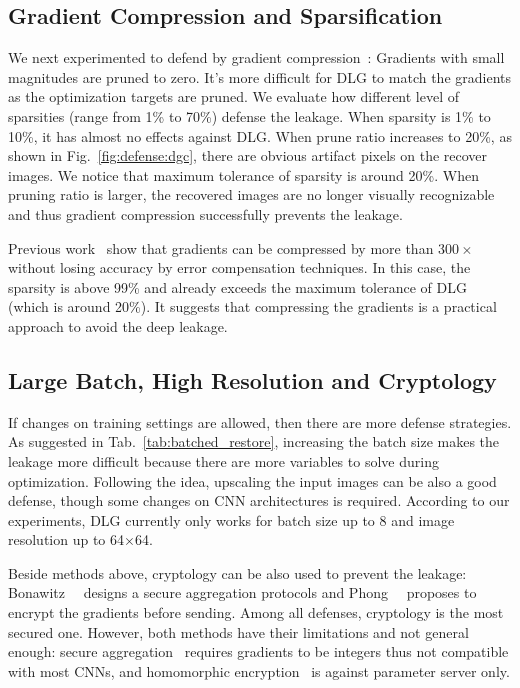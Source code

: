 
\subsection{Gradient Compression and Sparsification} \label{sec:defense:few_gradients}
We next experimented to defend by gradient compression~\cite{lin2017deep, tsuzuku2018variance}: Gradients with small magnitudes are pruned to zero. It's more difficult for DLG to match the gradients as the optimization targets are pruned.
% 
We evaluate how different level of sparsities (range from 1\% to 70\%) defense the leakage. When sparsity is 1\% to 10\%, it has almost no effects against DLG. When prune ratio increases to 20\%, as shown in Fig.~\ref{fig:defense:dgc}, there are obvious artifact pixels on the recover images.  
% 
We notice that maximum tolerance of sparsity is around 20\%. 
When pruning ratio is larger, the recovered images are no longer visually recognizable and thus gradient compression successfully prevents the leakage.

Previous work~\cite{tsuzuku2018variance, lin2017deep} show that gradients can be compressed by more than 300$\textbf{}\times$ without losing accuracy by error compensation techniques. In this case, the sparsity is above 99\% and already exceeds the maximum tolerance of DLG (which is around 20\%). It suggests that compressing the gradients is a practical approach to avoid the deep leakage. 

\subsection{Large Batch, High Resolution and Cryptology}\label{sec:defend:others}

If changes on training settings are allowed, then there are more defense strategies. As suggested in Tab.~\ref{tab:batched_restore}, increasing the batch size makes the leakage more difficult because there are more variables to solve during optimization. 
% 
Following the idea, upscaling the input images can be also a good defense, though some changes on CNN architectures is required. 
% 
According to our experiments, DLG currently only works for batch size up to 8 and image resolution up to 64$\times$64. 

Beside methods above, cryptology can be also used to prevent the leakage: Bonawitz~\etal~\cite{bonawitz16secure_Aggregation} designs a secure aggregation protocols and Phong~\etal~\cite{phong2018privacy} proposes to encrypt the gradients before sending. Among all defenses, cryptology is the most secured one. However, both methods have their limitations and not general enough: secure aggregation~\cite{bonawitz16secure_Aggregation} requires gradients to be integers thus not compatible with most CNNs, and homomorphic encryption~\cite{phong2018privacy} is against parameter server only. 

